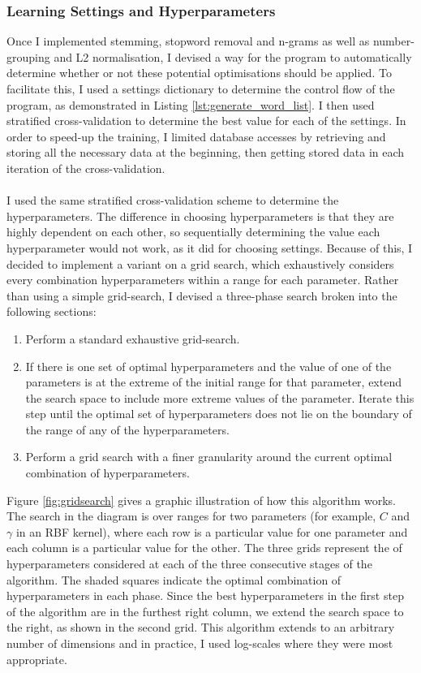 \documentclass[12pt,a4paper,twoside,openright]{report}
\newcommand{\mylisting}[4]{}
\newcommand{\pylisting}[2]{\mylisting{Python}{py}{#1}{#2}}
\begin{document}
\subsubsection{Learning Settings and Hyperparameters} \label{impl-learning}

Once I implemented stemming, stopword removal and n-grams as well as number-grouping and L2 normalisation, I devised a way for the program to automatically determine whether or not these potential optimisations should be applied. To facilitate this, I used a settings dictionary to determine the control flow of the program, as demonstrated in Listing \ref{lst:generate_word_list}. I then used stratified cross-validation to determine the best value for each of the settings. In order to speed-up the training, I limited database accesses by retrieving and storing all the necessary data at the beginning, then getting stored data in each iteration of the cross-validation.
\\
\pylisting{A function which uses given settings to produce a word list of a given text.}{generate_word_list}
\\
I used the same stratified cross-validation scheme to determine the hyperparameters. The difference in choosing hyperparameters is that they are highly dependent on each other, so sequentially determining the value each hyperparameter would not work, as it did for choosing settings. Because of this, I decided to implement a variant on a grid search, which exhaustively considers every combination hyperparameters within a range for each parameter. Rather than using a simple grid-search, I devised a three-phase search broken into the following sections:
\begin{enumerate}
	\item Perform a standard exhaustive grid-search.
	\item If there is one set of optimal hyperparameters and the value of one of the parameters is at the extreme of the initial range for that parameter, extend the search space to include more extreme values of the parameter. Iterate this step until the optimal set of hyperparameters does not lie on the boundary of the range of any of the hyperparameters.
	\item Perform a grid search with a finer granularity around the current optimal combination of hyperparameters.
\end{enumerate}
Figure \ref{fig:gridsearch} gives a graphic illustration of how this algorithm works. The search in the diagram is over ranges for two parameters (for example, $C$ and $\gamma$ in an RBF kernel), where each row is a particular value for one parameter and each column is a particular value for the other. The three grids represent the of hyperparameters considered at each of the three consecutive stages of the algorithm. The shaded squares indicate the optimal combination of hyperparameters in each phase. Since the best hyperparameters in the first step of the algorithm are in the furthest right column, we extend the search space to the right, as shown in the second grid. This algorithm extends to an arbitrary number of dimensions and in practice, I used log-scales where they were most appropriate.
\end{document}
